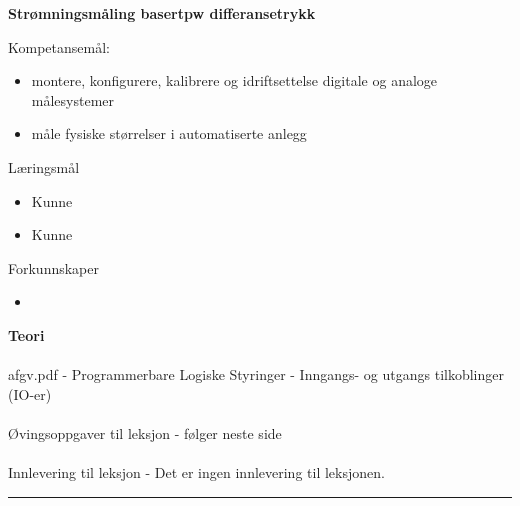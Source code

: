 \centerline{\bf Strømningsmåling basertpw differansetrykk}  \bigskip

Kompetansemål:
\begin{itemize}[noitemsep]

	\item montere, konfigurere, kalibrere og idriftsettelse digitale og analoge målesystemer
	\item måle fysiske størrelser i automatiserte anlegg
\end{itemize}
	Læringsmål
	\begin{itemize}[noitemsep]
		\item Kunne 
		\item Kunne 
	\end{itemize}

	Forkunnskaper

	\begin{itemize}[noitemsep]
		\item 

	\end{itemize}
\textbf{Teori}\\\\
afgv.pdf - Programmerbare Logiske Styringer - Inngangs- og utgangs tilkoblinger (IO-er)\\\\
Øvingsoppgaver til leksjon - følger neste side\\\\
Innlevering til leksjon - Det er ingen innlevering til leksjonen. 
\bigskip 
\hrule
\vfil \eject
